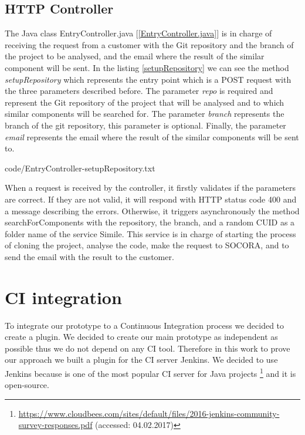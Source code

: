 {\subsection{HTTP Controller}
The Java class EntryController.java [\ref{EntryController.java}] is in charge of receiving the request from a customer with the Git repository and the branch of the project to be analysed, and the email where the result of the similar component will be sent. In the listing \ref{setupRepository} we can see the method \emph{setupRepository} which represents the entry point which is a POST request with the three parameters described before. The parameter \emph{repo} is required and represent the Git repository of the project that will be analysed and to which similar components will be searched for. The parameter \emph{branch} represents the branch of the git repository, this parameter is optional. Finally, the parameter \emph{email} represents the email where the result of the similar components will be sent to.


{code/EntryController-setupRepository.txt}

When a request is received by the controller, it firstly validates if the parameters are correct. If they are not valid, it will respond with HTTP status code 400 and a message describing the errors. Otherwise, it triggers asynchronously the method searchForComponents with the repository, the branch, and a random CUID as a folder name of the service Simile. This service is in charge of starting the process of cloning the project, analyse the code, make the request to SOCORA, and to send the email with the result to the customer.

\section{CI integration}
\label{ci-integration}
To integrate our prototype to a Continuous Integration process we decided to create a plugin. We decided to create our main prototype as independent as possible thus we do not depend on any CI tool. Therefore in this work to prove our approach we built a plugin for the CI server Jenkins. We decided to use Jenkins because is one of the most popular CI server for Java projects \footnote{\url{https://www.cloudbees.com/sites/default/files/2016-jenkins-community-survey-responses.pdf} (accessed: 04.02.2017)} and it is open-source.

}
